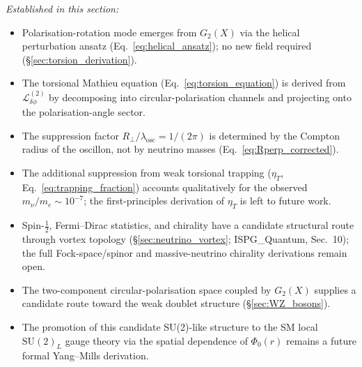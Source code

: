 \documentclass[11pt]{article}
\begin{document}
\textit{Established in this section:}
\begin{itemize}
  \item Polarisation-rotation mode emerges from
    $G_2(X)$ via the helical perturbation ansatz
    (Eq.~\ref{eq:helical_ansatz}); no new field
    required (\S\ref{sec:torsion_derivation}).
  \item The torsional Mathieu equation
    (Eq.~\ref{eq:torsion_equation}) is derived
    from $\mathcal{L}^{(2)}_{\delta\phi}$
    by decomposing into circular-polarisation
    channels and projecting onto the
    polarisation-angle sector.
  \item The suppression factor
    $R_\perp/\lambda_{\mathrm{osc}}
    = 1/(2\pi)$ is determined by the Compton
    radius of the oscillon, not by neutrino
    masses (Eq.~\ref{eq:Rperp_corrected}).
  \item The additional suppression from weak
    torsional trapping ($\eta_T$,
    Eq.~\ref{eq:trapping_fraction}) accounts
    qualitatively for the observed
    $m_\nu/m_e \sim 10^{-7}$; the first-principles
    derivation of $\eta_T$ is left to future work.
  \item Spin-$\frac{1}{2}$, Fermi--Dirac
    statistics, and chirality have a candidate
    structural route through vortex topology
    (\S\ref{sec:neutrino_vortex};
    ISPG\_Quantum, Sec.~10); the full
    Fock-space/spinor and massive-neutrino
    chirality derivations remain open.
  \item The two-component circular-polarisation
    space coupled by $G_2(X)$ supplies a candidate
    route toward the weak doublet structure
    (\S\ref{sec:WZ_bosons}).
  \item The promotion of this candidate SU(2)-like
    structure to the SM local $\mathrm{SU}(2)_L$
    gauge theory via the spatial dependence of
    $\Phi_0(r)$ remains a future formal
    Yang--Mills derivation.
\end{itemize}
\end{document}
